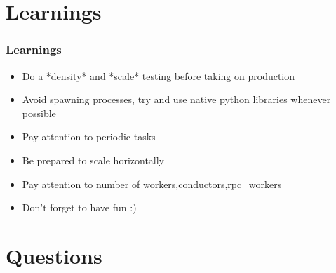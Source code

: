 \documentclass[aspectratio=169,11pt,hyperref={colorlinks=true}]{beamer}
\begin{document}
\section{Learnings}
\begin{frame}
    \frametitle{Learnings}
    \begin{itemize}[<+-| alert@+>]
        \item Do a *density* and *scale* testing before taking on production
        \item Avoid spawning processes, try and use native python libraries whenever possible
        \item Pay attention to periodic tasks
        \item Be prepared to scale horizontally
        \item Pay attention to number of workers,conductors,rpc\_workers
        \item Don't forget to have fun :)
    \end{itemize}
\end{frame}


\section{Questions}
\end{document}
